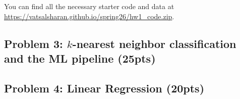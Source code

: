\documentclass{article}
\newcommand{\blue}[1]{{\color{blue}#1}}
\begin{document}
 You can find all the necessary starter code and data at \url{https://vatsalsharan.github.io/spring26/hw1_code.zip}.

\subsection*{Problem 3: $k$-nearest neighbor classification and the ML pipeline (\blue{25pts})}
     
\subsection*{Problem 4: Linear Regression (\blue{20pts})}
    
\end{document}
